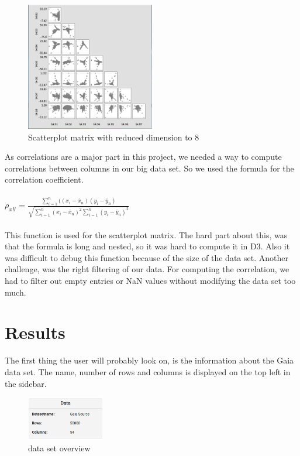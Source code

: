 \documentclass{vgtc}                          %
\begin{document}
\begin{figure}[H]
\includegraphics[width=0.5\textwidth]{splom.PNG}
\centering
\caption{Scatterplot matrix with reduced dimension to 8}
\end{figure}


As correlations are a major part in this project, we needed a way to compute correlations between columns in our big data set.
So we used the formula for the correlation coefficient.\cite{corr}
\\
\\
$\rho_x{}_y$ = $\frac{\sum_{i=1}^n ((x_i-\overline{x}_n)(y_i - \overline{y}_n)}{\sqrt{\sum_{i=1}^n (x_i - \overline{x}_n)^2\sum_{i=1}^n(y_i - \overline{y}_n)^2}}$
\\
\\
This function is used for the scatterplot matrix.
The hard part about this, was that the formula is long and nested, so it was hard to compute it in D3. Also it was difficult to debug this function because of the size of the data set. Another challenge, was the right filtering of our data. For computing the correlation, we had to filter out empty entries or NaN values without modifying the data set too much.

\section{Results}
The first thing the user will probably look on, is the information about the Gaia data set. The name, number of rows and columns is displayed on the top left in the sidebar. \\

\begin{figure}[H]
\includegraphics[width=0.3\textwidth]{1d.png}
\centering
\caption{data set overview}
\end{figure}
\end{document}
